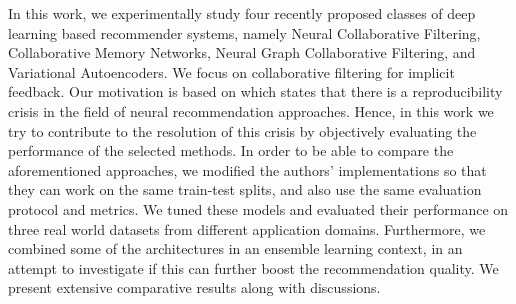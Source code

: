 In this work, we experimentally study four recently proposed classes of deep learning based recommender systems, namely Neural Collaborative
Filtering, Collaborative Memory Networks, Neural Graph Collaborative Filtering, and Variational Autoencoders.
We focus on collaborative filtering for implicit feedback.
Our motivation is based on \cite{dacrema2019we} which states that there is a reproducibility crisis in the field of neural recommendation approaches.
Hence, in this work we try to contribute to the resolution of this crisis by objectively evaluating the performance of the selected methods.
In order to be able to compare the aforementioned approaches, we modified the authors' implementations so that they can work on the same train-test splits, and also use the same evaluation protocol and metrics.
We tuned these models and evaluated their performance on three real world datasets from different application domains.
Furthermore, we combined some of the architectures in an ensemble learning context, in an attempt to investigate if this can further boost the recommendation quality.
We present extensive comparative results along with discussions.
